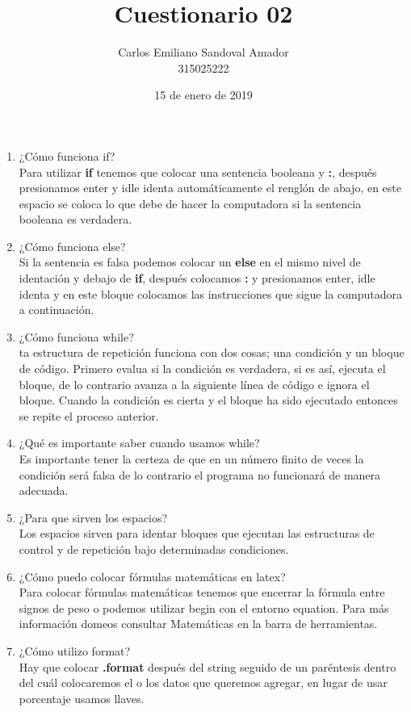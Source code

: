 \documentclass[letterpaper, 12pt, oneside]{article}%
\title{Cuestionario 02}
\author{Carlos Emiliano Sandoval Amador \\ 315025222}
\date{15 de enero de 2019}
\begin{document}
	\maketitle
	\begin{enumerate}
		\item ¿Cómo funciona if? \\ Para utilizar \textbf{if} tenemos que colocar una sentencia booleana y \textbf{:}, después presionamos enter y idle identa automáticamente el renglón de abajo, en este espacio se coloca lo que debe de hacer la computadora si la sentencia booleana es verdadera.
		\item ¿Cómo funciona else? \\ Si la sentencia es falsa podemos colocar un \textbf{else} en el mismo nivel de identación y debajo de \textbf{if}, después colocamos \textbf{:} y presionamos enter, idle identa y en este bloque colocamos las instrucciones que sigue la computadora a continuación.
		\item ¿Cómo funciona while? \\ ta estructura de repetición funciona con dos cosas; una condición y un bloque de código. Primero evalua si la condición es verdadera, si es así, ejecuta el bloque, de lo contrario avanza a la siguiente línea de código e ignora el bloque. Cuando la condición es cierta y el bloque ha sido ejecutado entonces se repite el proceso anterior.
		\item ¿Qué es importante saber cuando usamos while? \\ Es importante tener la certeza de que en un número finito de veces la condición será falsa de lo contrario el programa no funcionará de manera adecuada.
		\item ¿Para que sirven los espacios? \\ Los espacios sirven para identar bloques que ejecutan las estructuras de control y de repetición bajo determinadas condiciones. 
		\item ¿Cómo puedo colocar fórmulas matemáticas en latex? \\ Para colocar fórmulas matemáticas tenemos que encerrar la fórmula entre signos de peso o podemos utilizar begin con el entorno equation. Para más información domeos consultar Matemáticas en la barra de herramientas.
		\item ¿Cómo utilizo format? \\ Hay que colocar \textbf{.format} después del string seguido de un paréntesis dentro del cuál colocaremos el o los datos que queremos agregar, en lugar de usar porcentaje usamos llaves.

\end{enumerate}
\end{document}
